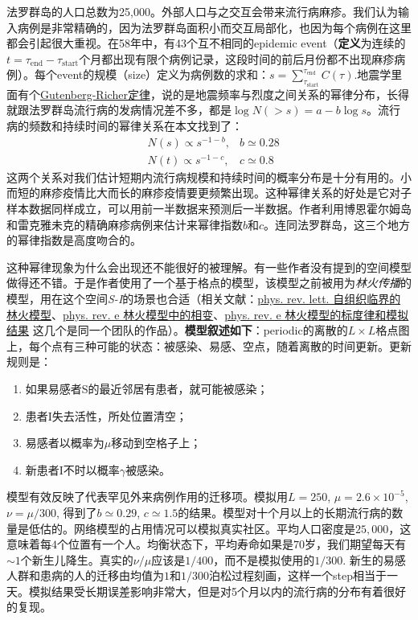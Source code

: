 法罗群岛的人口总数为25,000。外部人口与之交互会带来流行病麻疹。我们认为输入病例是非常精确的，因为法罗群岛面积小而交互局部化，也因为每个病例在这里都会引起很大重视。在58年中，有43个互不相同的epidemic event（\textbf{定义}为连续的$t = \tau_{\text{end}}-\tau_{\text{start}}$个月都出现有限个病例记录，这段时间的前后月份都不出现麻疹病例）。每个event的规模（size）定义为病例数的求和：$s = \sum_{\tau_{\text{start}}}^{\tau_{\text{end}}} C(\tau)$.地震学里面有个\href{https://www.nature.com/articles/nature04094}{Gutenberg-Richer定律}，说的是地震频率与烈度之间关系的幂律分布，长得就跟法罗群岛流行病的发病情况差不多，都是$\log N(>s) = a-b\log s$。流行病的频数和持续时间的幂律关系在本文找到了：\begin{align}
    &N(s) \propto s^{-1-b}, &b\simeq 0.28\\
    &N(t) \propto s^{-1-c}, &c\simeq 0.8
\end{align}这两个关系对我们估计短期内流行病规模和持续时间的概率分布是十分有用的。小而短的麻疹疫情比大而长的麻疹疫情要更频繁出现。这种幂律关系的好处是它对子样本数据同样成立，可以用前一半数据来预测后一半数据。作者利用博恩霍尔姆岛和雷克雅未克的精确麻疹病例来估计来幂律指数$b$和$c$。连同法罗群岛，这三个地方的幂律指数是高度吻合的。

这种幂律现象为什么会出现还不能很好的被理解。有一些作者没有提到的空间模型做得还不错。于是作者使用了一个基于格点的模型，该模型之前被用为\textit{林火传播}的模型，用在这个空间\textit{S-I}的场景也合适（相关文献：\href{https://journals.aps.org/prl/abstract/10.1103/PhysRevLett.69.1629}{phys. rev. lett. 自组织临界的林火模型}、\href{https://journals.aps.org/pre/abstract/10.1103/PhysRevE.55.2174}{phys. rev. e 林火模型中的相变}、\href{https://journals.aps.org/pre/abstract/10.1103/PhysRevE.50.1009}{phys. rev. e 林火模型的标度律和模拟结果} 这几个是同一个团队的作品）。\textbf{模型叙述如下}：periodic的离散的$L\times L$格点图上，每个点有三种可能的状态：被感染、易感、空点，随着离散的时间更新。更新规则是：

\begin{enumerate}
    \item 如果易感者S的最近邻居有患者，就可能被感染；
    \item 患者I失去活性，所处位置清空；
    \item 易感者以概率为$\mu$移动到空格子上；
    \item 新患者I不时以概率$\gamma$被感染。
\end{enumerate}

模型有效反映了代表罕见外来病例作用的迁移项。模拟用$L = 250$, $\mu = 2.6\times 10^{-5}$, $\nu = \mu/300$, 得到了$b\simeq 0.29$, $c\simeq 1.5$的结果。模型对十个月以上的长期流行病的数量是低估的。网络模型的占用情况可以模拟真实社区。平均人口密度是$25,000$，这意味着每$4$个位置有一个人。均衡状态下，平均寿命如果是$70$岁，我们期望每天有$\sim 1$个新生儿降生。真实的$\nu/\mu$应该是$1/400$，而不是模拟使用的$1/300$. 新生的易感人群和患病的人的迁移由均值为$1$和$1/300$泊松过程刻画，这样一个step相当于一天。模拟结果受长期误差影响非常大，但是对5个月以内的流行病的分布有着很好的复现。

